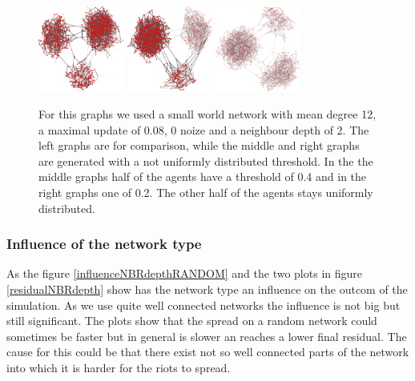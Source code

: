 \begin{figure}
\includegraphics[width=0.25\textwidth]{batchRun__kHalf=2-2-2_maxUpdate=0.08_noize=0_nbrDepth=2/network1000-crop.pdf}
\hfill
\includegraphics[width=0.25\textwidth]{batchRun__kHalf=2-2-2_maxUpdate=0.08_noize=0_nbrDepth=2_fixedthreshold=0.4/network1000-crop.pdf}
\hfill
\includegraphics[width=0.25\textwidth]{batchRun__kHalf=2-2-2_maxUpdate=0.08_noize=0_nbrDepth=2_fixedthreshold=0.2/network1000-crop.pdf}

\caption{For this graphs we used a small world network with mean degree 12, a maximal update of 0.08, 0 noize and a neighbour depth of 2. The left graphs are for comparison, while the middle and right graphs are generated with a not uniformly distributed threshold. In the the middle graphs half of the agents have a threshold of 0.4 and in the right graphs one of 0.2. The other half of the agents stays uniformly distributed.}
\label{influencenthresholdnetwork}
\end{figure}

\subsubsection{Influence of the network type}
\label{sec:influencenetworktype}
As the figure \ref{influenceNBRdepthRANDOM} and the two plots in figure \ref{residualNBRdepth} show has the network type an influence on the outcom of the simulation. As we use quite well connected networks the influence is not big but still significant. The plots show that the spread on a random network could sometimes be faster but in general is slower an reaches a lower final residual. The cause for this could be that there exist not so well connected parts of the network into which it is harder for the riots to spread.

